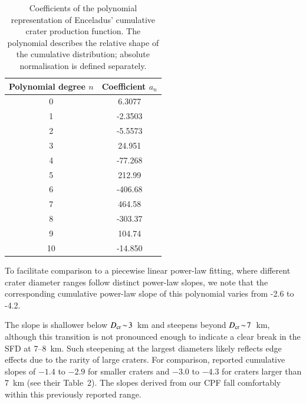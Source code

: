 \documentclass[preprint,11pt,3p,times,authoryear]{elsarticle}
\begin{document}


\begin{table}[t]%
\centering
\begin{tabular}{cc}
\hline
\textbf{Polynomial degree $n$} & \textbf{Coefficient $a_n$} \\
\hline
0 & 6.3077  \\
1 & -2.3503 \\
2 & -5.5573 \\
3 & 24.951  \\
4 & -77.268 \\
5 & 212.99  \\
6 & -406.68 \\
7 & 464.58  \\
8 & -303.37 \\
9 & 104.74  \\
10 & -14.850 \\
\hline
\end{tabular}
\caption{Coefficients of the polynomial representation of Enceladus’ cumulative crater production function. The polynomial describes the relative shape of the cumulative distribution; absolute normalisation is defined separately.}
\label{tab:cpf}
\end{table}

To facilitate comparison to a piecewise linear power-law fitting, where different crater diameter ranges follow distinct power-law slopes, we note that the corresponding cumulative power-law slope of this polynomial varies from -2.6 to -4.2.

The slope is shallower below $D_{\rm cr}\!\sim\!3$~km and steepens beyond $D_{\rm cr}\!\sim\!7$~km, although this transition is not pronounced enough to indicate a clear break in the SFD at 7--8~km. Such steepening at the largest diameters likely reflects edge effects due to the rarity of large craters. 
For comparison, \citet{Kirchoff2009} reported cumulative slopes of $-1.4$ to $-2.9$ 
for smaller craters and $-3.0$ to $-4.3$ for craters larger than 7~km (see their Table~2). The slopes derived from our CPF fall comfortably within this previously reported range.\\
\end{document}

